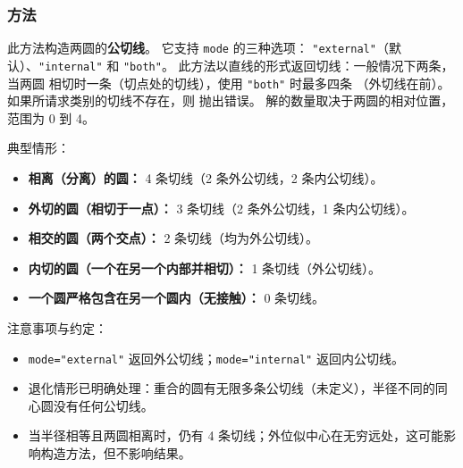 \subsubsection{方法 }
\label{ssub:common_tangent}

此方法构造两圆的\textbf{公切线}。
它支持 \verb|mode| 的三种选项：
\verb|"external"|（默认）、\verb|"internal"| 和 \verb|"both"|。
此方法以直线的形式返回切线：一般情况下两条，当两圆
相切时一条（切点处的切线），使用 \verb|"both"| 时最多四条
（外切线在前）。如果所请求类别的切线不存在，则
抛出错误。
解的数量取决于两圆的相对位置，范围为 0 到 4。
\medskip

典型情形：
\begin{itemize}
\small
\item \textbf{相离（分离）的圆：} 4 条切线（2 条外公切线，2 条内公切线）。
\item \textbf{外切的圆（相切于一点）：} 3 条切线（2 条外公切线，1 条内公切线）。
\item \textbf{相交的圆（两个交点）：} 2 条切线（均为外公切线）。
\item \textbf{内切的圆（一个在另一个内部并相切）：} 1 条切线（外公切线）。
\item \textbf{一个圆严格包含在另一个圆内（无接触）：} 0 条切线。
\end{itemize}

注意事项与约定：
\begin{itemize}
\item \verb|mode="external"| 返回外公切线；\verb|mode="internal"| 返回内公切线。
\item 退化情形已明确处理：重合的圆有无限多条公切线（未定义），半径不同的同心圆没有任何公切线。
\item 当半径相等且两圆相离时，仍有 4 条切线；外位似中心在无穷远处，这可能影响构造方法，但不影响结果。
\end{itemize}

\medskip


\begin{tkzexample}[latex=.45\textwidth]
\begin{center}
\end{center}
\end{tkzexample}


